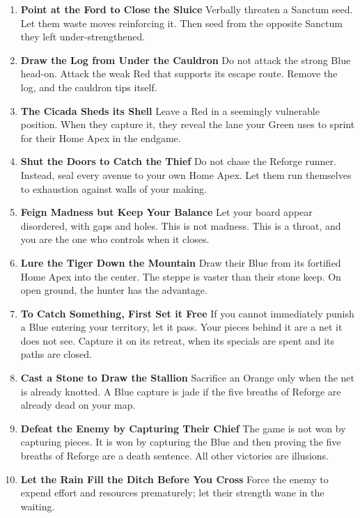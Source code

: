 \documentclass[11pt,letterpaper]{article}
\begin{document}
\begin{enumerate}
\item \textbf{Point at the Ford to Close the Sluice}
Verbally threaten a Sanctum seed. Let them waste moves reinforcing it. Then seed from the opposite Sanctum they left under-strengthened.

\item \textbf{Draw the Log from Under the Cauldron}
Do not attack the strong Blue head-on. Attack the weak Red that supports its escape route. Remove the log, and the cauldron tips itself.

\item \textbf{The Cicada Sheds its Shell}
Leave a Red in a seemingly vulnerable position. When they capture it, they reveal the lane your Green uses to sprint for their Home Apex in the endgame.

\item \textbf{Shut the Doors to Catch the Thief}
Do not chase the Reforge runner. Instead, seal every avenue to your own Home Apex. Let them run themselves to exhaustion against walls of your making.

\item \textbf{Feign Madness but Keep Your Balance}
Let your board appear disordered, with gaps and holes. This is not madness. This is a throat, and you are the one who controls when it closes.

\item \textbf{Lure the Tiger Down the Mountain}
Draw their Blue from its fortified Home Apex into the center. The steppe is vaster than their stone keep. On open ground, the hunter has the advantage.

\item \textbf{To Catch Something, First Set it Free}
If you cannot immediately punish a Blue entering your territory, let it pass. Your pieces behind it are a net it does not see. Capture it on its retreat, when its specials are spent and its paths are closed.

\item \textbf{Cast a Stone to Draw the Stallion}
Sacrifice an Orange only when the net is already knotted. A Blue capture is jade if the five breaths of Reforge are already dead on your map.

\item \textbf{Defeat the Enemy by Capturing Their Chief}
The game is not won by capturing pieces. It is won by capturing the Blue and then proving the five breaths of Reforge are a death sentence. All other victories are illusions.

\item \textbf{Let the Rain Fill the Ditch Before You Cross}
Force the enemy to expend effort and resources prematurely; let their strength wane in the waiting.


\end{enumerate}
\end{document}
